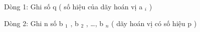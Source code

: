 Dòng 1: Ghi số q ( số hiệu của dãy hoán vị a   $_    i   $   )  

   Dòng 2: Ghi n số b   $_    1   $   , b   $_    2   $   , …, b   $_    n   $   ( dãy hoán vị có số hiệu p )  

\
